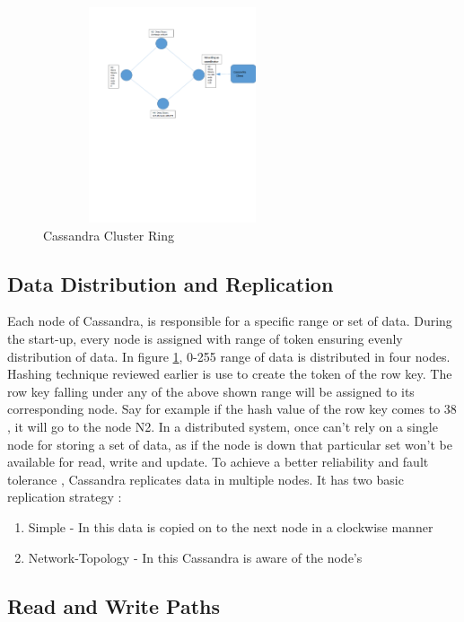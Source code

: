 \documentclass[9pt,twocolumn,twoside]{styles/osajnl}
\begin{document}
\begin{figure}[h]
\begin{center}
\includegraphics[width =3in,height=2.5in]{images/Cassandra_Ring_figure1}
\caption{Cassandra Cluster Ring}
\label{fig:figure1}
\end{center}
\end{figure}

\subsection{Data Distribution and Replication}

Each node of Cassandra, is responsible for a specific range or set of data. During the start-up, every node is assigned with range of token ensuring evenly distribution of data. In figure \ref{fig:figure1}, 0-255 range of data is distributed in four nodes. Hashing technique reviewed earlier is use to create the token of the row key. The row key falling under any of the above shown range will be assigned to its corresponding node. Say for example if the hash value of the row key comes to 38 , it will go to the node N2. 
In a distributed system, once can't rely on a single node for storing a set of data, as if the node is down that particular set won't be available for read, write and update. To achieve a better reliability and fault tolerance , Cassandra replicates data in multiple nodes. It has two basic replication strategy : 
\begin{enumerate}
     \item Simple - In this data is copied on to the next node in a clockwise manner
     \item Network-Topology - In this Cassandra is aware of the node's     
\end{enumerate}

\subsection{Read and Write Paths}
\end{document}
